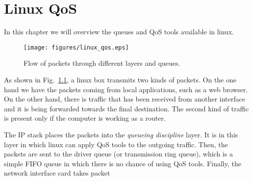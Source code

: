 \chapter{Linux QoS}

In this chapter we will overview the queues and QoS tools available in linux.
\begin{figure}[!h]
\centering
\texttt{[image: figures/linux\_qos.eps]}
\caption{Flow of packets through different layers and queues.}
\label{fig:linux_qos}
\end{figure}

As shown in Fig.~\ref{fig:linux_qos}, a linux box transmits two kinds of packets.
On the one hand we have the packets coming from local applications, such as a web browser.
On the other hand, there is traffic that has been received from another interface and it is being forwarded towards the final destination.
The second kind of traffic is present only if the computer is working as a router.

The IP stack places the packets into the \emph{queueing discipline} layer.
It is in this layer in which linux can apply QoS tools to the outgoing traffic.
Then, the packets are sent to the driver queue (or transmission ring queue), which is a simple FIFO queue in which there is no chance of using QoS tools.
Finally, the network interface card takes packet

